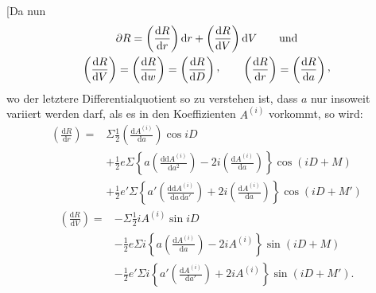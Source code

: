 [Da nun
\[
\begin{gathered}
\partial R=\left(\frac{\mathrm{d}R}{\mathrm{d}r}\right)\mathrm{d}r+\left(\frac{\mathrm{d}R}{\mathrm{d}V}\right)\mathrm{d}V\qquad\text{und}\\
\left(\frac{\mathrm{d}R}{\mathrm{d}V}\right)=\left(\frac{\mathrm{d}R}{\mathrm{d}w}\right)=\left(\frac{\mathrm{d}R}{\mathrm{d}D}\right)\text{\raisebox{.45ex}{,}}\qquad
\left(\frac{\mathrm{d}R}{\mathrm{d}r}\right)=\left(\frac{\mathrm{d}R}{\mathrm{d}a}\right)\text{\raisebox{.45ex}{,}}
\end{gathered}
\]
\noindent wo der letztere Differentialquotient so zu verstehen ist, dass \(a\) nur insoweit variiert werden darf, als es in den Koeffizienten \(A^{(i)}\) vorkommt, so wird:
\[
\begin{aligned}
\left(\frac{\mathrm{d}R}{\mathrm{d}r}\right)={}&\Sigma\tfrac12\left(\frac{\mathrm{d}A^{(i)}}{\mathrm{d}a}\right)\cos iD\\
&+\tfrac12 e\Sigma\left\{a\left(\frac{\mathrm{d}\mathrm{d}A^{(i)}}{\mathrm{d}a^2}\right)-2i\left(\frac{\mathrm{d}A^{(i)}}{\mathrm{d}a}\right)\right\}\cos(iD+M)\\
&+\tfrac12 e'\Sigma\left\{a'\left(\frac{\mathrm{d}\mathrm{d}A^{(i)}}{\mathrm{d}a\,\mathrm{d}a'}\right)+2i\left(\frac{\mathrm{d}A^{(i)}}{\mathrm{d}a}\right)\right\}\cos(iD+M')
\end{aligned}
\]
\[
\begin{aligned}
\left(\frac{\mathrm{d}R}{\mathrm{d}V}\right)={}&-\Sigma\tfrac12 iA^{(i)}\sin iD\\
&-\tfrac12 e\Sigma i\left\{a\left(\frac{\mathrm{d}A^{(i)}}{\mathrm{d}a}\right)-2iA^{(i)}\right\}\sin(iD+M)\\
&-\tfrac12 e'\Sigma i\left\{a'\left(\frac{\mathrm{d}A^{(i)}}{\mathrm{d}a'}\right)+2iA^{(i)}\right\}\sin(iD+M').
\end{aligned}
\]

